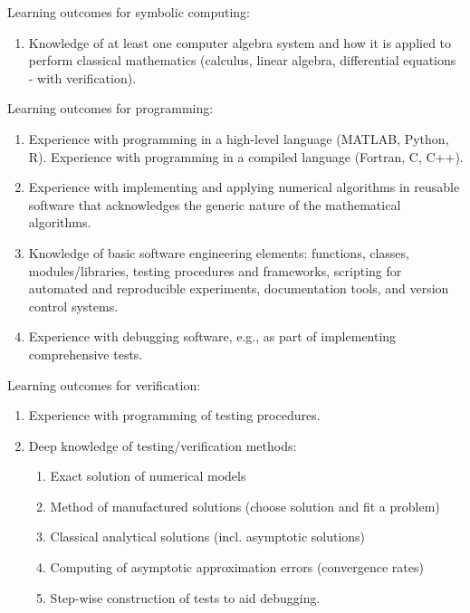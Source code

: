 \documentclass[%
oneside,                 %
final,                   %
10pt]{article}
\begin{document}
\noindent
Learning outcomes for symbolic computing:
\begin{enumerate}
\item Knowledge of at least one computer algebra system and how it is applied to perform classical mathematics (calculus, linear algebra, differential equations - with verification).
\end{enumerate}

\noindent
Learning outcomes for programming:
\begin{enumerate}
\item Experience with programming in a high-level language (MATLAB, Python, R). Experience with programming in a compiled language (Fortran, C, C++).

\item Experience with implementing and applying numerical algorithms in reusable software that acknowledges the generic nature of the mathematical algorithms.

\item Knowledge of basic software engineering elements: functions, classes, modules/libraries, testing procedures and frameworks, scripting for automated and reproducible experiments, documentation tools, and version control systems.

\item Experience with debugging software, e.g., as part of implementing comprehensive tests.
\end{enumerate}

\noindent
Learning outcomes for verification:
\begin{enumerate}
\item Experience with programming of testing procedures.

\item Deep knowledge of testing/verification methods:
\begin{enumerate}

 \item Exact solution of numerical models

 \item Method of manufactured solutions (choose solution and fit a problem)

 \item Classical analytical solutions (incl. asymptotic solutions) 

 \item Computing of asymptotic approximation errors (convergence rates)

 \item Step-wise construction of tests to aid debugging.
\end{enumerate}

\noindent
\end{enumerate}
\end{document}
